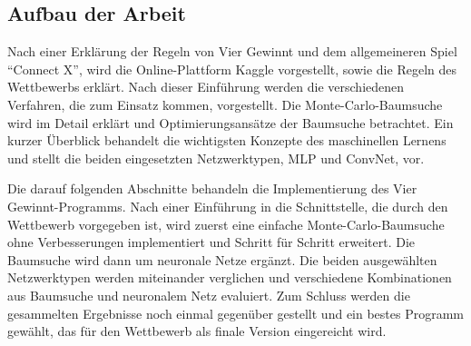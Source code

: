 \subsection{Aufbau der Arbeit}
Nach einer Erklärung der Regeln von Vier Gewinnt und dem allgemeineren Spiel “Connect X”, wird die Online-Plattform Kaggle vorgestellt, sowie die Regeln des Wettbewerbs erklärt. Nach dieser Einführung werden die verschiedenen Verfahren, die zum Einsatz kommen, vorgestellt. Die Monte-Carlo-Baumsuche wird im Detail erklärt und Optimierungsansätze der Baumsuche betrachtet. Ein kurzer Überblick behandelt die wichtigsten Konzepte des maschinellen Lernens und stellt die beiden eingesetzten Netzwerktypen, MLP und ConvNet, vor.
\par
Die darauf folgenden Abschnitte behandeln die Implementierung des Vier Gewinnt-Programms. Nach einer Einführung in die Schnittstelle, die durch den Wettbewerb vorgegeben ist, wird zuerst eine einfache Monte-Carlo-Baumsuche ohne Verbesserungen implementiert und Schritt für Schritt erweitert. Die Baumsuche wird dann um neuronale Netze ergänzt. Die beiden ausgewählten Netzwerktypen werden miteinander verglichen und verschiedene Kombinationen aus Baumsuche und neuronalem Netz evaluiert. Zum Schluss werden die gesammelten Ergebnisse noch einmal gegenüber gestellt und ein bestes Programm gewählt, das für den Wettbewerb als finale Version eingereicht wird.


